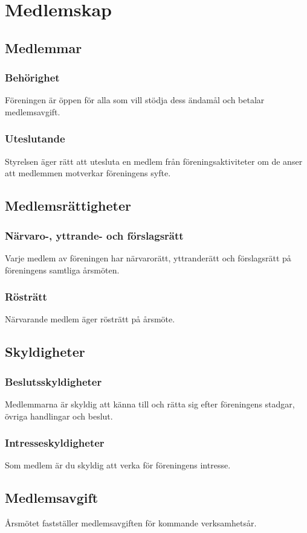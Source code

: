 \section{Medlemskap}

\subsection{Medlemmar}

\subsubsection{Behörighet}
Föreningen är öppen för alla som vill stödja dess ändamål och betalar medlemsavgift. 

\subsubsection{Uteslutande}
Styrelsen äger rätt att utesluta en medlem från föreningsaktiviteter om de anser att medlemmen motverkar föreningens syfte.

\subsection{Medlemsrättigheter}

\subsubsection{Närvaro-, yttrande- och förslagsrätt}
Varje medlem av föreningen har närvarorätt, yttranderätt och förslagsrätt på föreningens samtliga årsmöten.

\subsubsection{Rösträtt}
Närvarande medlem äger rösträtt på årsmöte. 

\subsection{Skyldigheter}

\subsubsection{Beslutsskyldigheter}
Medlemmarna är skyldig att känna till och rätta sig efter föreningens stadgar, övriga handlingar och beslut. 

\subsubsection{Intresseskyldigheter}
Som medlem är du skyldig att verka för föreningens intresse. 

\subsection{Medlemsavgift}
Årsmötet fastställer medlemsavgiften för kommande verksamhetsår.
